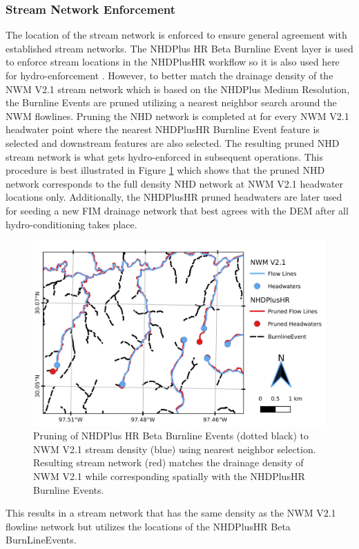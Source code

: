 \subsubsection{Stream Network Enforcement} 
\label{ssec:stream_network_enforcment}
%
The location of the stream network is enforced to ensure general agreement with established stream networks.
The NHDPlus HR Beta Burnline Event layer is used to enforce stream locations in the NHDPlusHR workflow so it is also used here for hydro-enforcement \cite{moore2019user}. 
However, to better match the drainage density of the NWM V2.1 stream network which is based on the NHDPlus Medium Resolution, the Burnline Events are pruned utilizing a nearest neighbor search around the NWM flowlines. 
Pruning the NHD network is completed at for every NWM V2.1 headwater point where the nearest NHDPlusHR Burnline Event feature is selected and downstream features are also selected.
The resulting pruned NHD stream network is what gets hydro-enforced in subsequent operations.
This procedure is best illustrated in Figure \ref{fig:stream_density_pruning} which shows that the pruned NHD network corresponds to the full density NHD network at NWM V2.1 headwater locations only. 
Additionally, the NHDPlusHR pruned headwaters are later used for seeding a new FIM drainage network that best agrees with the DEM after all hydro-conditioning takes place.
%
\begin{figure}[h!]
\centering
\includegraphics[scale=1.0]{figures/headwaters.jpg}
\caption{Pruning of NHDPlus HR Beta Burnline Events (dotted black) to NWM V2.1 stream density (blue) using nearest neighbor selection. Resulting stream network (red) matches the drainage density of NWM V2.1 while corresponding spatially with the NHDPlusHR Burnline Events.}
\label{fig:stream_density_pruning}
\end{figure}
%
This results in a stream network that has the same density as the NWM V2.1 flowline network but utilizes the locations of the NHDPlusHR Beta BurnLineEvents. 


